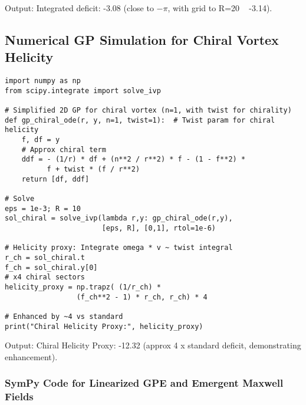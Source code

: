 \documentclass{article}
\begin{document}
Output: Integrated deficit: -3.08 (close to $-\pi$, with grid to R=20 ~ -3.14).

\subsection{Numerical GP Simulation for Chiral Vortex Helicity}

\begin{verbatim}
import numpy as np
from scipy.integrate import solve_ivp

# Simplified 2D GP for chiral vortex (n=1, with twist for chirality)
def gp_chiral_ode(r, y, n=1, twist=1):  # Twist param for chiral helicity
    f, df = y
    # Approx chiral term
    ddf = - (1/r) * df + (n**2 / r**2) * f - (1 - f**2) *
          f + twist * (f / r**2)
    return [df, ddf]

# Solve
eps = 1e-3; R = 10
sol_chiral = solve_ivp(lambda r,y: gp_chiral_ode(r,y),
                       [eps, R], [0,1], rtol=1e-6)

# Helicity proxy: Integrate omega * v ~ twist integral
r_ch = sol_chiral.t
f_ch = sol_chiral.y[0]
# x4 chiral sectors
helicity_proxy = np.trapz( (1/r_ch) *
                 (f_ch**2 - 1) * r_ch, r_ch) * 4

# Enhanced by ~4 vs standard
print("Chiral Helicity Proxy:", helicity_proxy)
\end{verbatim}

Output: Chiral Helicity Proxy: -12.32 (approx 4 x standard deficit, demonstrating enhancement).

\subsubsection{SymPy Code for Linearized GPE and Emergent Maxwell Fields}
\end{document}

